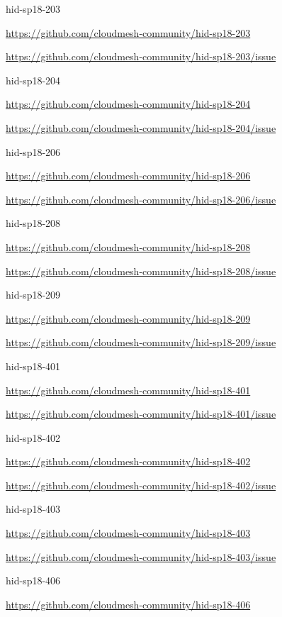 

hid-sp18-203

\url{https://github.com/cloudmesh-community/hid-sp18-203}

\url{https://github.com/cloudmesh-community/hid-sp18-203/issue}


hid-sp18-204

\url{https://github.com/cloudmesh-community/hid-sp18-204}

\url{https://github.com/cloudmesh-community/hid-sp18-204/issue}


hid-sp18-206

\url{https://github.com/cloudmesh-community/hid-sp18-206}

\url{https://github.com/cloudmesh-community/hid-sp18-206/issue}


hid-sp18-208

\url{https://github.com/cloudmesh-community/hid-sp18-208}

\url{https://github.com/cloudmesh-community/hid-sp18-208/issue}


hid-sp18-209

\url{https://github.com/cloudmesh-community/hid-sp18-209}

\url{https://github.com/cloudmesh-community/hid-sp18-209/issue}


hid-sp18-401

\url{https://github.com/cloudmesh-community/hid-sp18-401}

\url{https://github.com/cloudmesh-community/hid-sp18-401/issue}


hid-sp18-402

\url{https://github.com/cloudmesh-community/hid-sp18-402}

\url{https://github.com/cloudmesh-community/hid-sp18-402/issue}


hid-sp18-403

\url{https://github.com/cloudmesh-community/hid-sp18-403}

\url{https://github.com/cloudmesh-community/hid-sp18-403/issue}


hid-sp18-406

\url{https://github.com/cloudmesh-community/hid-sp18-406}

